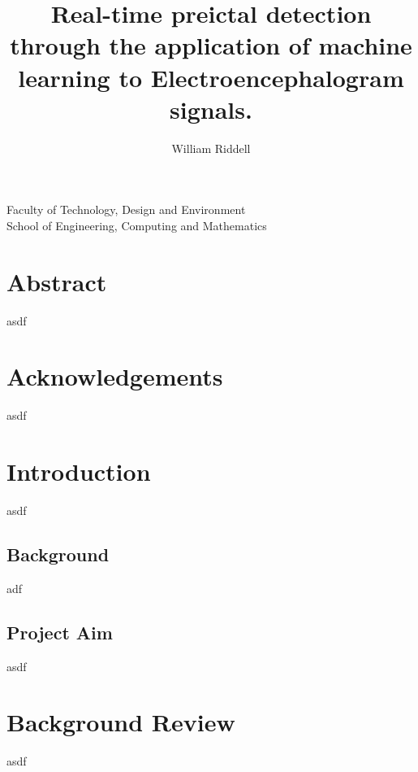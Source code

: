 \documentclass[12pt]{article}
\title{Real-time preictal detection through the application of machine learning to Electroencephalogram signals.}
\author{William Riddell}
\date{\parbox{\linewidth}{\centering%
\vspace{0.5cm}
\today\endgraf\bigskip\vspace{0.5cm} 
Word Count: 10,000 \\ \vspace{0.5cm}  
Supervised by Kashinath Basu}}
\begin{document}
\maketitle

\vfill 
\begin{center} 
Faculty of Technology, Design and Environment\\
School of Engineering, Computing and Mathematics
\end{center}
\pagebreak
\tableofcontents
\pagebreak

\printglossary[type=\acronymtype]

\section{Abstract}

asdf









\section{Acknowledgements}

asdf








\section{Introduction}

asdf

\subsection{Background}

adf

\subsection{Project Aim}

asdf





\section{Background Review}

asdf
\end{document}
